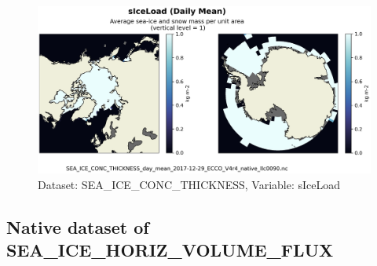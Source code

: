 \begin{figure}[H]
\centering
\includegraphics[scale=0.55]{../images/plots/v4r4/native_plots/Sea-Ice_and_Snow_Concentration_and_Thickness/sIceLoad.png}
\caption{Dataset: SEA\_ICE\_CONC\_THICKNESS, Variable: sIceLoad}
\label{tab:table-SEA_ICE_CONC_THICKNESS_sIceLoad-Plot}
\end{figure}
\newpage
\subsection{Native dataset of SEA\_ICE\_HORIZ\_VOLUME\_FLUX}
\newp
